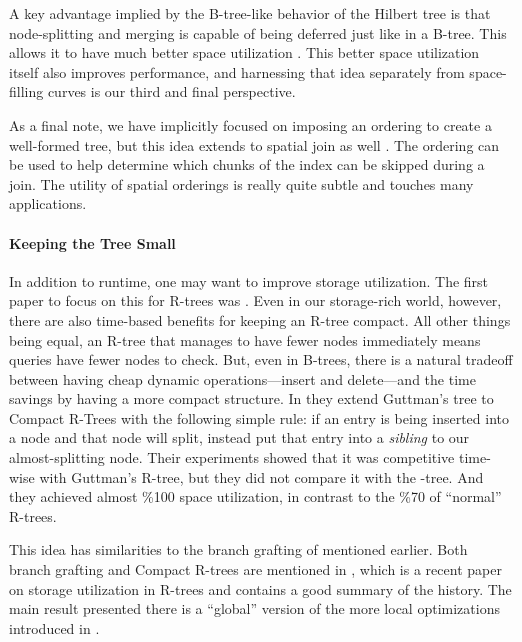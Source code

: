 A key advantage implied by the B-tree-like behavior of the Hilbert tree is that node-splitting and merging is capable of being deferred just like in a B-tree.
This allows it to have much better space utilization \cite{kamelfaloutsos94}.
This better space utilization itself also improves performance, and harnessing that idea separately from space-filling curves is our third and final perspective.

As a final note, we have implicitly focused on imposing an ordering to create a well-formed tree, but this idea extends to spatial join as well \cite{jacoxsamet07,orenstein86}.
The ordering can be used to help determine which chunks of the index can be skipped during a join.
The utility of spatial orderings is really quite subtle and touches many applications.

\paragraph{Keeping the Tree Small}
In addition to runtime, one may want to improve storage utilization.
The first paper to focus on this for R-trees was \cite{huanglinlin01}.
Even in our storage-rich world, however, there are also time-based benefits for keeping an R-tree compact.
All other things being equal, an R-tree that manages to have fewer nodes immediately means queries have fewer nodes to check.
But, even in B-trees, there is a natural tradeoff between having cheap dynamic operations---insert and delete---and the time savings by having a more compact structure.
In \cite{huanglinlin01} they extend Guttman's tree to Compact R-Trees with the following simple rule: if an entry is being inserted into a node and that node will split, instead put that entry into a \emph{sibling} to our almost-splitting node.
Their experiments showed that it was competitive time-wise with Guttman's R-tree, but they did not compare it with the \rstar-tree.
And they achieved almost \%100 space utilization, in contrast to the \%70 of ``normal'' R-trees.

This idea has similarities to the branch grafting of \cite{schrekchen00} mentioned earlier.
Both branch grafting and Compact R-trees are mentioned in \cite{zhanglucheng06}, which is a recent paper on storage utilization in R-trees and contains a good summary of the history.
The main result presented there is a ``global'' version of the more local optimizations introduced in \cite{huanglinlin01}.

